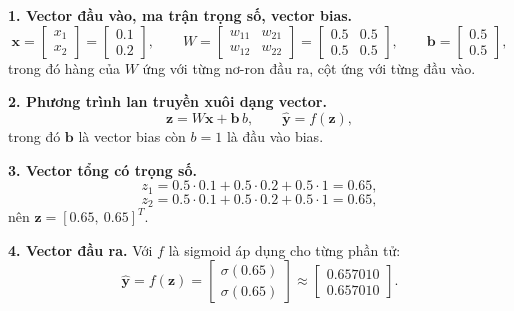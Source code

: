 \documentclass[a4paper,12pt]{article}
\begin{document}
\textbf{1. Vector đầu vào, ma trận trọng số, vector bias.}
\[ \mathbf{x} = \begin{bmatrix} x_1 \\ x_2 \end{bmatrix} = \begin{bmatrix} 0.1 \\ 0.2 \end{bmatrix},
   \qquad
   W = \begin{bmatrix} w_{11} & w_{21} \\ w_{12} & w_{22} \end{bmatrix}
     = \begin{bmatrix} 0.5 & 0.5 \\ 0.5 & 0.5 \end{bmatrix},
   \qquad
   \mathbf{b} = \begin{bmatrix} 0.5 \\ 0.5 \end{bmatrix}, \]
trong đó hàng của $W$ ứng với từng nơ-ron đầu ra, cột ứng với từng đầu vào.

\textbf{2. Phương trình lan truyền xuôi dạng vector.}
\[ \mathbf{z} = W\mathbf{x} + \mathbf{b}\,b, \qquad
   \hat{\mathbf{y}} = f(\mathbf{z}), \]
trong đó $\mathbf{b}$ là vector bias còn $b = 1$ là đầu vào bias.

\textbf{3. Vector tổng có trọng số.}
\[ z_1 = 0.5\cdot 0.1 + 0.5\cdot 0.2 + 0.5\cdot 1 = 0.65, \]
\[ z_2 = 0.5\cdot 0.1 + 0.5\cdot 0.2 + 0.5\cdot 1 = 0.65, \]
nên $\mathbf{z} = [0.65,\ 0.65]^T$.

\textbf{4. Vector đầu ra.} Với $f$ là sigmoid áp dụng cho từng phần tử:
\[ \hat{\mathbf{y}} = f(\mathbf{z})
   = \begin{bmatrix} \sigma(0.65) \\ \sigma(0.65) \end{bmatrix}
   \approx \begin{bmatrix} 0.657010 \\ 0.657010 \end{bmatrix}. \]
\end{document}
